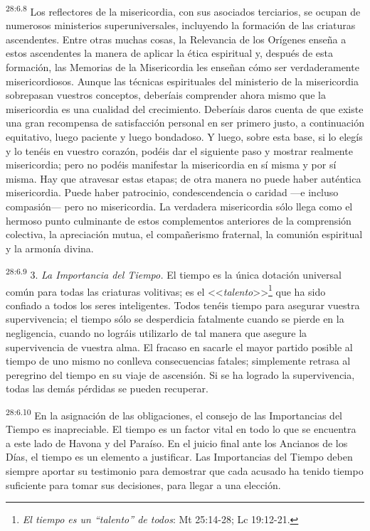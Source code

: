\par
\textsuperscript{28:6.8} Los reflectores de la misericordia, con sus asociados terciarios, se ocupan de numerosos ministerios superuniversales, incluyendo la formación de las criaturas ascendentes. Entre otras muchas cosas, la Relevancia de los Orígenes enseña a estos ascendentes la manera de aplicar la ética espiritual y, después de esta formación, las Memorias de la Misericordia les enseñan cómo ser verdaderamente misericordiosos. Aunque las técnicas espirituales del ministerio de la misericordia sobrepasan vuestros conceptos, deberíais comprender ahora mismo que la misericordia es una cualidad del crecimiento. Deberíais daros cuenta de que existe una gran recompensa de satisfacción personal en ser primero justo, a continuación equitativo, luego paciente y luego bondadoso. Y luego, sobre esta base, si lo elegís y lo tenéis en vuestro corazón, podéis dar el siguiente paso y mostrar realmente misericordia; pero no podéis manifestar la misericordia en sí misma y por sí misma. Hay que atravesar estas etapas; de otra manera no puede haber auténtica misericordia. Puede haber patrocinio, condescendencia o caridad ---e incluso compasión--- pero no misericordia. La verdadera misericordia sólo llega como el hermoso punto culminante de estos complementos anteriores de la comprensión colectiva, la apreciación mutua, el compañerismo fraternal, la comunión espiritual y la armonía divina.

\par
\textsuperscript{28:6.9} 3. \textit{La Importancia del Tiempo.} El tiempo es la única dotación universal común para todas las criaturas volitivas; es el <<\textit{talento}>>\footnote{\textit{El tiempo es un ``talento'' de todos}: Mt 25:14-28; Lc 19:12-21.} que ha sido confiado a todos los seres inteligentes. Todos tenéis tiempo para asegurar vuestra supervivencia; el tiempo sólo se desperdicia fatalmente cuando se pierde en la negligencia, cuando no lográis utilizarlo de tal manera que asegure la supervivencia de vuestra alma. El fracaso en sacarle el mayor partido posible al tiempo de uno mismo no conlleva consecuencias fatales; simplemente retrasa al peregrino del tiempo en su viaje de ascensión. Si se ha logrado la supervivencia, todas las demás pérdidas se pueden recuperar.

\par
\textsuperscript{28:6.10} En la asignación de las obligaciones, el consejo de las Importancias del Tiempo es inapreciable. El tiempo es un factor vital en todo lo que se encuentra a este lado de Havona y del Paraíso. En el juicio final ante los Ancianos de los Días, el tiempo es un elemento a justificar. Las Importancias del Tiempo deben siempre aportar su testimonio para demostrar que cada acusado ha tenido tiempo suficiente para tomar sus decisiones, para llegar a una elección.

